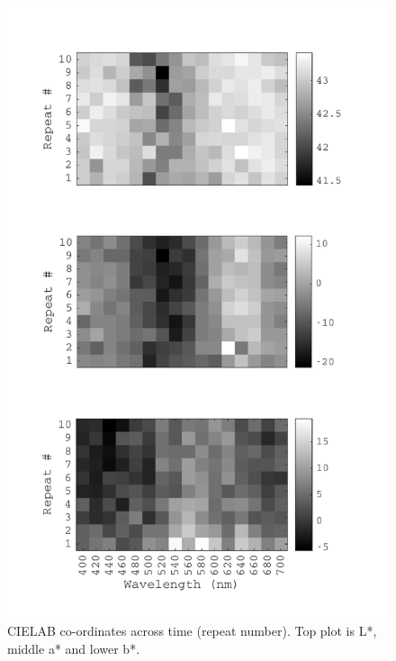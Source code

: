 \begin{figure}[htbp]
\includegraphics[max width=1.2\textwidth, center]{figs/LargeSphere/LMdataOverTime.pdf}
\caption{CIELAB co-ordinates across time (repeat number). Top plot is L*, middle a* and lower b*.}
\label{fig:timeLM}
\end{figure}

